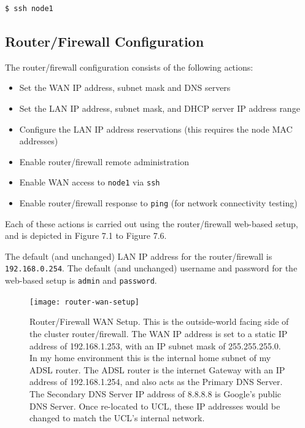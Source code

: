 \documentclass{report}
\begin{document}
\lstset{style=type}
\begin{lstlisting}[]
$ ssh node1
\end{lstlisting}


%
%

\subsection{Router/Firewall Configuration}

The router/firewall configuration consists of the following actions:

\begin{itemize}
  \item Set the WAN IP address, subnet mask and DNS servers
  \item Set the LAN IP address, subnet mask, and DHCP server IP address range
  \item Configure the LAN IP address reservations (this requires the node MAC addresses)
  \item Enable router/firewall remote administration
  \item Enable WAN access to \verb|node1| via \verb|ssh|
  \item Enable router/firewall response to \verb|ping| (for network connectivity testing)
\end{itemize}

Each of these actions is carried out using the router/firewall web-based setup, and is depicted in Figure 7.1 to Figure 7.6.

The default (and unchanged) LAN IP address for the router/firewall is \verb|192.168.0.254|. The default (and unchanged) username and password for the web-based setup is \verb|admin| and \verb|password|.

\begin{figure}[H]
	\centering	
	\texttt{[image: router-wan-setup]}
	\caption{Router/Firewall WAN Setup. This is the outside-world facing side of the cluster router/firewall. The WAN IP address is set to a static IP address of 192.168.1.253, with an IP subnet mask of 255.255.255.0. In my home environment this is the internal home subnet of my ADSL router. The ADSL router is the internet Gateway with an IP address of 192.168.1.254, and also acts as the Primary DNS Server. The Secondary DNS Server IP address of 8.8.8.8 is Google's public DNS Server. Once re-located to UCL, these IP addresses would be changed to match the UCL's internal network.}
\end{figure}
\end{document}
